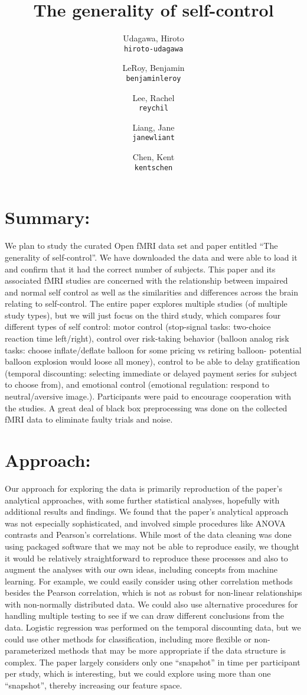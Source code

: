 \documentclass[11pt]{article}
\title{The generality of self-control}
\author{
  Udagawa, Hiroto\\
  \texttt{hiroto-udagawa}
  \and
  LeRoy, Benjamin\\
  \texttt{benjaminleroy}
  \and
  Lee, Rachel\\
  \texttt{reychil}
  \and
  Liang, Jane\\
  \texttt{janewliant}
  \and
  Chen, Kent\\
  \texttt{kentschen}
}
\begin{document}
\maketitle

\section{Summary:}
We plan to study the curated Open fMRI data set and paper entitled “The generality of self-control”. We have downloaded the data and were able to load it and confirm that it had the correct number of subjects. This paper and its associated fMRI studies are concerned with the relationship between impaired and normal self control as well as the similarities and differences across the brain relating to self-control. The entire paper explores multiple studies (of multiple study types), but we will just focus on the third study, which compares four different types of self control: motor control (stop-signal tasks: two-choice reaction time left/right),  control over risk-taking behavior (balloon analog risk tasks: choose inflate/deflate balloon for some pricing vs retiring balloon- potential balloon explosion would loose all money), control to be able to delay gratification (temporal discounting: selecting immediate or delayed payment series for subject to choose from), and emotional control (emotional regulation: respond to neutral/aversive image.). Participants were paid to encourage cooperation with the studies. A great deal of black box preprocessing was done on the collected fMRI data to eliminate faulty trials and noise. 

\section{Approach:}
Our approach for exploring the data is primarily reproduction of the paper’s analytical approaches, with some further statistical analyses, hopefully with additional results and findings. We found that the paper’s analytical approach was not especially sophisticated, and involved simple procedures like ANOVA contrasts and Pearson’s correlations. While most of the data cleaning was done using packaged software that we may not be able to reproduce easily, we thought it would be relatively straightforward to reproduce these processes and also to augment the analyses with our own ideas, including concepts from machine learning. For example, we could easily consider using other correlation methods besides the Pearson correlation, which is not as robust for non-linear relationships with non-normally distributed data. We could also use alternative procedures for handling multiple testing to see if we can draw different conclusions from the data. Logistic regression was performed on the temporal discounting data, but we could use other methods for classification, including more flexible or non-parameterized methods that may be more appropriate if the data structure is complex. The paper largely considers only one “snapshot” in time per participant per study, which is interesting, but we could explore using more than one “snapshot”, thereby increasing our feature space. 



\end{document}
